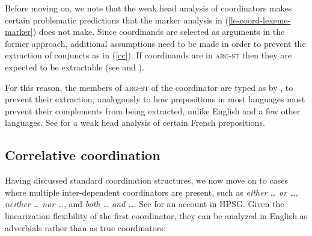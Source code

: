 {Before moving on, we note that the weak head analysis of coordinators makes certain problematic predictions that the marker analysis in (\ref{le-coord-lexeme-marker}) does not make. Since coordinands are selected as arguments in the former approach,  additional assumptions need to be made in
 order to prevent the  extraction of conjuncts as in (\ref{cc}).
If coordinands are in \textsc{arg-st} then they are expected to be extractable
(see  and \crossrefchapterw[\page \pageref{page-hpsg-traceless-account-arg-st-extraction-conjuncts}]{islands}).


\z




\noindent
For this reason, the members of \textsc{arg-st} of the coordinator are typed as  by \citet[]{Abeille:03}, to prevent their extraction, analogously to how prepositions in most languages must prevent their complements from being extracted, unlike English and a few other languages.
See \citet[Section~3.2]{Abeille06} for a weak head analysis of certain French prepositions.




\subsection{Correlative coordination}\label{correlphr}


Having discussed standard coordination structures, we now move on to cases where
multiple inter-dependent coordinators are present, such as \emph{either \ldots{} or \ldots{}},
\emph{neither \ldots{} nor \ldots{}}, 
and \emph{both \ldots{} and \ldots{}}. See \citet{hof} for an account  in HPSG. Given the linearization flexibility of the first coordinator, they  can be analyzed in English as adverbials rather than as true coordinators:

}
